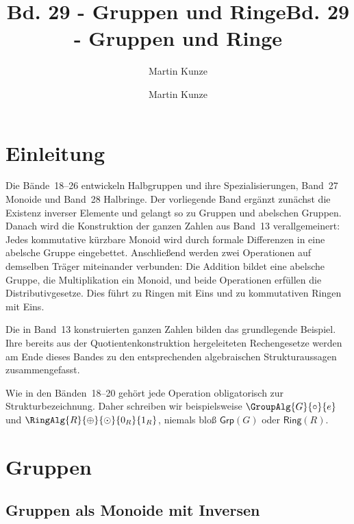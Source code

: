 \documentclass[main.tex]{subfiles}
\title{Bd. 29 - Gruppen und Ringe}
\author{Martin Kunze}
\date{}
\begin{document}
\newcommand{\BandXXIXProofRefStack}[1]{%
  \ensuremath{\begin{gathered}#1\end{gathered}}}

\title{Bd. 29 - Gruppen und Ringe}
\author{Martin Kunze}
\date{}
\hypersetup{pageanchor=false}
\maketitle
\hypersetup{pageanchor=true}
\setcounter{tocdepth}{3}
\tableofcontents
\setcounter{file}{29}
\renewcommand{\FormulaBandID}{29}

\chapter{Einleitung}

Die Bände~18--26 entwickeln Halbgruppen und ihre Spezialisierungen,
Band~27 Monoide und Band~28 Halbringe.
Der vorliegende Band ergänzt zunächst die Existenz inverser Elemente und
gelangt so zu Gruppen und abelschen Gruppen. Danach wird die Konstruktion
der ganzen Zahlen aus Band~13 verallgemeinert: Jedes kommutative kürzbare
Monoid wird durch formale Differenzen in eine abelsche Gruppe eingebettet.
Anschließend werden zwei Operationen auf demselben Träger miteinander
verbunden: Die Addition bildet eine abelsche Gruppe, die Multiplikation ein
Monoid, und beide Operationen erfüllen die Distributivgesetze. Dies führt zu
Ringen mit Eins und zu kommutativen Ringen mit Eins.

Die in Band~13 konstruierten ganzen Zahlen bilden das grundlegende Beispiel.
Ihre bereits aus der Quotientenkonstruktion hergeleiteten Rechengesetze
werden am Ende dieses Bandes zu den entsprechenden algebraischen
Strukturaussagen zusammengefasst.

Wie in den Bänden~18--20 gehört jede Operation obligatorisch zur
Strukturbezeichnung. Daher schreiben wir beispielsweise
\(\GroupAlg{G}{\circ}{e}\) und
\(\RingAlg{R}{\oplus}{\odot}{0_R}{1_R}\), niemals bloß
\(\mathsf{Grp}(G)\) oder \(\mathsf{Ring}(R)\).

\chapter{Gruppen}

\section{Gruppen als Monoide mit Inversen}
\end{document}

